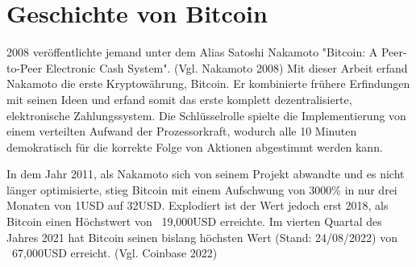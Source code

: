 \section{Geschichte von Bitcoin}
2008 veröffentlichte jemand unter dem Alias Satoshi Nakamoto "Bitcoin: A Peer-to-Peer Electronic Cash System". (Vgl. Nakamoto 2008) 
Mit dieser Arbeit erfand Nakamoto die erste Kryptowährung, Bitcoin. Er kombinierte frühere Erfindungen mit seinen Ideen und 
erfand somit das erste komplett dezentralisierte, elektronische Zahlungssystem. Die Schlüsselrolle spielte die Implementierung 
von einem verteilten Aufwand der Prozessorkraft, wodurch alle 10 Minuten demokratisch für die korrekte Folge von Aktionen 
abgestimmt werden kann.

In dem Jahr 2011, als Nakamoto sich von seinem Projekt abwandte und es nicht länger optimisierte, stieg Bitcoin mit einem
Aufschwung von 3000\% in nur drei Monaten von 1USD auf 32USD. Explodiert ist der Wert jedoch erst 2018, als Bitcoin einen
Höchstwert von ~19,000USD erreichte. Im vierten Quartal des Jahres 2021 hat Bitcoin seinen bislang höchsten Wert (Stand: 24/08/2022)
von ~67,000USD erreicht. (Vgl. Coinbase 2022)